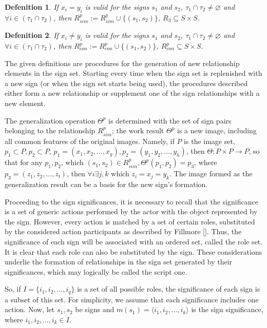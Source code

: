 \documentclass[12pt]{scrartcl}
\newtheorem{definition}{Defenition}
\begin{document}
	\begin{definition}
		If $x_i=y_i$ is valid for the signs $s_1$ and $s_2$, $\tau_1\cap\tau_2\not =\varnothing$ and $\forall i\in(\tau_1\cap\tau_2)$, then $R^p_{sim}:=R^p_{sim}\cup\{(s_1,s_2)\}$, $R_3\subseteq S\times S$.
	\end{definition}
	
	\begin{definition}
		If $x_i\not =y_i$ is valid for the signs $s_1$ and $s_2$, $\tau_1\cap\tau_2\not =\varnothing$ and $\forall i\in(\tau_1\cap\tau_2)$, then $R^p_{con}:=R^p_{con}\cup\{(s_1,s_2)\}$, $R^p_{con}\subseteq S\times S$.
	\end{definition}

	The given definitions are procedures for the generation of new relationship elements in the sign set. Starting every time when the sign set is replenished with a new sign (or when the sign set starts being used), the procedures described either form a new relationship or supplement one of the sign relationships with a new element.
	
	The generalization operation $\Theta^p$ is determined with the set of sign pairs belonging to the relationship $R^p_{sim}$; the work result $\Theta^p$ is a new image, including all common features of the original images. Namely, if $P$ is the image set, $p_1\subset P,p_2\subset P$, $p_1=(x_1,x_2,\dots,x_g), p_2=(y_1,y_2,\dots,y_h)$, then $\Theta:P\times P\rightarrow P$, so that for any $p_1,p_2$, which $(s_1,s_2)\in R^p_{sim}, \Theta^p(p_1,p_2)=p_3$, where $p_3=(z_1,z_2,\dots, z_l)$, then $\forall i\exists j,k$ which $z_i=x_j=y_k$. The image formed as the generalization result can be a basis for the new sign's formation.
	
	Proceeding to the sign significances, it is necessary to recall that the significance is a set of generic actions performed by the actor with the object represented by the sign. However, every action is matched by a set of certain roles, substituted by the considered action participants as described by Fillmore []. Thus, the significance of each sign will be associated with an ordered set, called the role set. It is clear that each role can also be substituted by the sign. These considerations underlie the formation of relationships in the sign set generated by their significances, which may logically be called the script one.
	
	So, if $I=\{i_1,i_2,\dots,i_q\}$ is a set of all possible roles, the significance of each sign is a subset of this set. For simplicity, we assume that each significance includes one action. Now, let $s_1, s_2$ be signs and $m(s_1)=\langle i_1,i_2,\dots,i_k \rangle$ is the sign significance, where $i_1,i_2,\dots,i_k\in I$.
		
\end{document}
